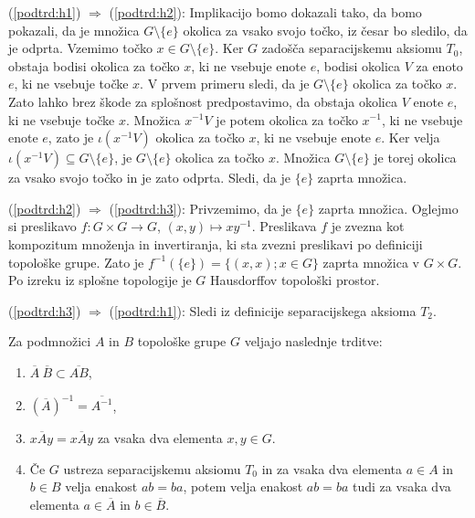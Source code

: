 \documentclass[mat1]{fmfdelo}
\newcommand{\closure}[1]{\overline{#1}}
\begin{document}
\begin{dokaz}
	(\ref{podtrd:h1}) $\Rightarrow$ (\ref{podtrd:h2}):
	Implikacijo bomo dokazali tako, da bomo pokazali, da je množica $G\setminus\lbrace e \rbrace$ okolica za vsako svojo točko, iz česar bo sledilo, da je odprta.
	Vzemimo točko $x \in G\setminus\lbrace e \rbrace$. Ker $G$ zadošča separacijskemu aksiomu $T_0$, obstaja bodisi okolica za točko $x$, ki ne vsebuje enote $e$, bodisi okolica $V$ za enoto $e$, ki ne vsebuje točke $x$. V prvem primeru sledi, da je $G\setminus\lbrace e \rbrace$ okolica za točko $x$.
	Zato lahko brez škode za splošnost predpostavimo, da obstaja okolica $V$ enote $e$, ki ne vsebuje točke $x$. Množica $x^{-1}V$ je potem okolica za točko $x^{-1}$, ki ne vsebuje enote $e$, zato je $\iota(x^{-1}V)$ okolica za točko $x$, ki ne vsebuje enote $e$. Ker velja $\iota(x^{-1}V) \subseteq G \setminus \lbrace e \rbrace$, je $G\setminus\lbrace e \rbrace$ okolica za točko $x$.
	Množica $G\setminus\lbrace e \rbrace$ je torej okolica za vsako svojo točko in je zato odprta. Sledi, da je $\lbrace e \rbrace$ zaprta množica.
	
	
	(\ref{podtrd:h2}) $\Rightarrow$ (\ref{podtrd:h3}):
	Privzemimo, da je $\lbrace e \rbrace$ zaprta množica. Oglejmo si preslikavo $f\colon G \times G \to G$, $(x, y) \mapsto xy^{-1}$. Preslikava $f$ je zvezna kot kompozitum množenja in invertiranja, ki sta zvezni preslikavi po definiciji topološke grupe. Zato je $f^{-1}(\lbrace e \rbrace) = \lbrace (x, x) ; x \in G \rbrace$ zaprta množica v $G \times G$. Po izreku iz splošne topologije je $G$ Hausdorffov topološki prostor.
	
	(\ref{podtrd:h3}) $\Rightarrow$ (\ref{podtrd:h1}):
	Sledi iz definicije separacijskega aksioma $T_2$.
\end{dokaz}


\begin{trditev}\label{trd:zaprtost}
	Za podmnožici $A$ in $B$ topološke grupe $G$ veljajo naslednje trditve:
	\begin{enumerate}
		\item $\closure{A}\ \closure{B} \subset \closure{A B}$,\label{podtrd:zap1}
		\item $(\closure{A})^{-1} = \closure{A^{-1}}$,\label{podtrd:zap2}
		\item $x \closure{A} y = \closure{x A y}$ za vsaka dva elementa $x, y \in G$.\label{podtrd:zap3}
		
		\item Če $G$ ustreza separacijskemu aksiomu $T_0$ in za vsaka dva elementa $a \in A$ in $b \in B$ velja enakost $ab = ba$, potem velja enakost $ab = ba$ tudi za vsaka dva elementa $a \in \closure{A}$ in $b \in \closure{B}$.\label{podtrd:zap4}
	\end{enumerate}
\end{trditev}
\end{document}
